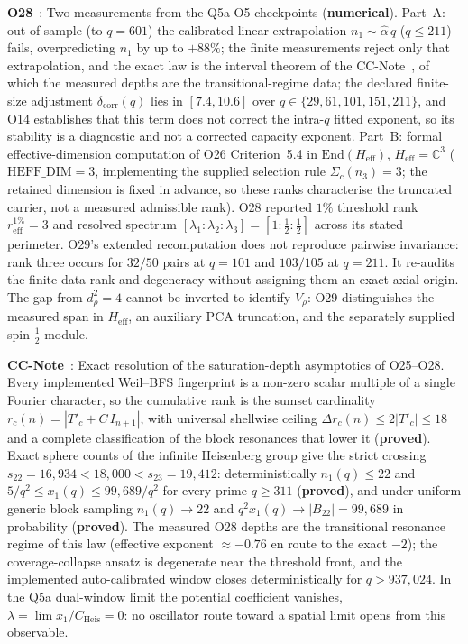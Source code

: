 \documentclass[11pt,a4paper]{article}
\newcommand{\sproved}{\textcolor{cproved}{\textbf{proved}}}
\newcommand{\snum}{\textcolor{cnum}{\textbf{numerical}}}
\begin{document}
    \textbf{O28}~\cite{Beau2026a32}: Two measurements from the Q5a-O5 checkpoints (\snum).
    Part~A: out of sample (to $q = 601$) the calibrated linear extrapolation
    $n_1 \sim \hat\alpha\,q$ ($q \le 211$) fails, overpredicting $n_1$ by up to $+88\%$; the
    finite measurements reject only that extrapolation, and the exact law is the interval theorem
    of the CC-Note~\cite{Beau2026ccnote}, of which the measured depths are the
    transitional-regime data;
    the declared finite-size adjustment $\delta_{\mathrm{corr}}(q)$ lies in $[7.4, 10.6]$ over
    $q \in \{29, 61, 101, 151, 211\}$, and O14 establishes that this term does not correct the intra-$q$
    fitted exponent, so its stability is a diagnostic and not a corrected capacity exponent.
    Part~B: formal effective-dimension computation of O26 Criterion~5.4 in
    $\mathrm{End}(H_{\mathrm{eff}})$, $H_{\mathrm{eff}} = \mathbb{C}^3$
    ($\mathrm{HEFF\_DIM} = 3$, implementing the supplied selection rule $\Sigma_c(n_3) = 3$; the
    retained dimension is fixed in advance, so these ranks characterise the truncated carrier,
    not a measured admissible rank).
    O28 reported $1\%$ threshold rank $r_{\mathrm{eff}}^{1\%}=3$ and resolved spectrum
    $[\lambda_1 : \lambda_2 : \lambda_3]=[1:\tfrac12:\tfrac12]$ across its stated perimeter.
    O29's extended recomputation does not reproduce pairwise invariance: rank three occurs for
    $32/50$ pairs at $q=101$ and $103/105$ at $q=211$. It re-audits the finite-data rank and
    degeneracy without assigning them an exact axial origin.
    The gap from $d_\rho^2 = 4$ cannot be inverted to identify $V_\rho$: O29 distinguishes the
    measured span in $H_{\mathrm{eff}}$, an auxiliary PCA truncation, and the separately supplied
    spin-$\tfrac12$ module.

    \textbf{CC-Note}~\cite{Beau2026ccnote}: Exact resolution of the saturation-depth asymptotics
    of O25--O28.
    Every implemented Weil--BFS fingerprint is a non-zero scalar multiple of a single Fourier
    character, so the cumulative rank is the sumset cardinality $r_c(n) = |T'_c + C\,I_{n+1}|$,
    with universal shellwise ceiling $\Delta r_c(n) \le 2|T'_c| \le 18$ and a complete
    classification of the block resonances that lower it (\sproved).
    Exact sphere counts of the infinite Heisenberg group give the strict crossing
    $s_{22} = 16{,}934 < 18{,}000 < s_{23} = 19{,}412$: deterministically $n_1(q) \le 22$ and
    $5/q^2 \le x_1(q) \le 99{,}689/q^2$ for every prime $q \ge 311$ (\sproved), and under uniform
    generic block sampling $n_1(q) \to 22$ and $q^2 x_1(q) \to |B_{22}| = 99{,}689$ in probability
    (\sproved).
    The measured O28 depths are the transitional resonance regime of this law (effective exponent
    $\approx -0.76$ en route to the exact $-2$); the coverage-collapse ansatz is degenerate near
    the threshold front, and the implemented auto-calibrated window closes deterministically for
    $q > 937{,}024$.
    In the Q5a dual-window limit the potential coefficient vanishes,
    $\lambda = \lim x_1/C_{\mathrm{Heis}} = 0$: no oscillator route toward a spatial limit opens
    from this observable.
\end{document}

